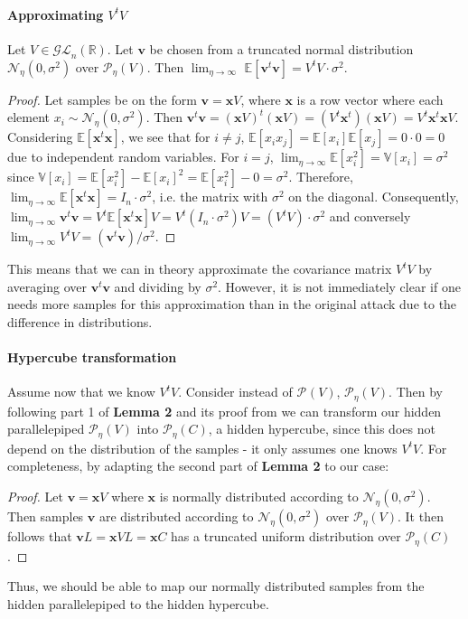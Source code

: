 \documentclass[12 pt]{article}        	%
\newcommand{\PP}[2][]{\mathcal{P}_{#1}(\mat{#2})}
\newcommand{\mat}[1]{\mathit{#1}}
\renewcommand{\vec}[1]{\mathbf{#1}}
\newcommand{\GLnR}{\mathcal{GL}_{n}(\mathbb{R})}
\newcommand{\bb}[1]{\mathbb{#1}}
\begin{document}
\paragraph{Approximating $\mat{V}^t \mat{V}$}
Let $\mat{V} \in \GLnR$. Let $\vec{v}$ be chosen from a truncated normal distribution $\mathcal{N}_{\eta}(0, \sigma^2)$ over $\PP[\eta]{V}$.
Then $\lim_{\eta\to\infty}$ $\bb{E}[\vec{v}^t\vec{v}] = \mat{V}^t \mat{V} \cdot \sigma^2$.

\begin{proof}
    Let samples be on the form $\vec{v} = \vec{x}\mat{V}$, where $\vec{x}$ is a row vector where each element $x_i \sim \mathcal{N}_{\eta}(0, \sigma^2)$.
    Then $\vec{v}^t\vec{v} = (\vec{x} \mat{V})^t (\vec{x} \mat{V}) = (\mat{V}^t \vec{x}^t)(\vec{x} \mat{V}) = \mat{V}^t \vec{x}^t \vec{x} \mat{V}$. Considering $\bb{E}[\vec{x}^t \vec{x}]$, we see that for $i \neq j$, 
$\bb{E}[x_i x_j] = \bb{E}[x_i] \bb{E}[x_j] = 0 \cdot 0 = 0$ due to independent random variables.
For $i=j$, $\lim_{\eta\to\infty} \bb{E}[x_i^2] = \bb{V}[x_i] = \sigma^2$ since $\bb{V}[x_i] = \bb{E}[x_i^2] - \bb{E}[x_i]^2 = \bb{E}[x_i^2] - 0 = \sigma ^2$.
Therefore, $\lim_{\eta\to\infty} \bb{E}[\vec{x}^t \vec{x}] = \mat{I}_n \cdot \sigma^2$, i.e. the matrix with $\sigma ^2$ on the diagonal.
Consequently, $\lim_{\eta\to\infty} \vec{v}^t \vec{v} = \mat{V}^t \bb{E}[\vec{x}^t\vec{x}] \mat{V} = \mat{V}^t (\mat{I}_n \cdot \sigma^2) \mat{V} = (\mat{V}^t \mat{V}) \cdot \sigma ^2$ 
and conversely $\lim_{\eta\to\infty} \mat{V}^t \mat{V} = (\vec{v}^t \vec{v})/ \sigma^2$.
\end{proof}

This means that we can in theory approximate the covariance matrix $\mat{V}^t \mat{V}$ by averaging over $\vec{v}^t \vec{v}$ and dividing by $\sigma ^2$. 
However, it is not immediately clear if one needs more samples for this approximation than in the original attack due to the difference in distributions.

\paragraph{Hypercube transformation}
Assume now that we know $\mat{V}^t \mat{V}$. Consider instead of $\PP{V}$, $\PP[\eta]{V}$.
Then by following part 1 of \textbf{Lemma 2} and its proof from \cite{NR09} we can transform our hidden parallelepiped $\PP[\eta]{V}$ into $\PP[\eta]{C}$, a hidden hypercube,
since this does not depend on the distribution of the samples - it only assumes one knows $\mat{V}^t\mat{V}$.
For completeness, by adapting the second part of \textbf{Lemma 2} to our case: 
\begin{proof}
    Let $\vec{v} = \vec{x}\mat{V}$ where $\vec{x}$ is normally distributed according to $\mathcal{N}_{\eta}(0, \sigma^2)$.
    Then samples $\vec{v}$ are distributed according to $\mathcal{N}_{\eta}(0, \sigma^2)$ over $\PP[\eta]{V}$.
    It then follows that $\vec{v}\mat{L} = \vec{x}\mat{V}\mat{L} = \vec{x}\mat{C}$ has a truncated uniform distribution over $\PP[\eta]{C}$.
\end{proof}
Thus, we should be able to map our normally distributed samples from the hidden parallelepiped to the hidden hypercube.
\end{document}
